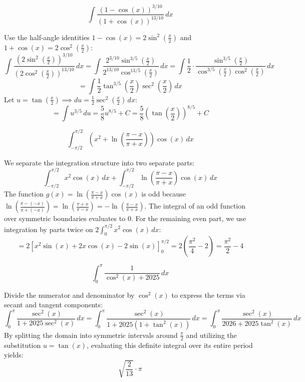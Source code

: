 \begin{questions}
    \question 
    \[ \int \frac{(1-\cos(x))^{3/10}}{(1+\cos(x))^{13/10}} \, dx \]
    \begin{solution}
        Use the half-angle identities $1-\cos(x) = 2\sin^2(\frac{x}{2})$ and $1+\cos(x) = 2\cos^2(\frac{x}{2})$:
        \[ \int \frac{\left(2\sin^2\left(\frac{x}{2}\right)\right)^{3/10}}{\left(2\cos^2\left(\frac{x}{2}\right)\right)^{13/10}} \, dx = \int \frac{2^{3/10}\sin^{3/5}\left(\frac{x}{2}\right)}{2^{13/10}\cos^{13/5}\left(\frac{x}{2}\right)} \, dx = \int \frac{1}{2} \cdot \frac{\sin^{3/5}\left(\frac{x}{2}\right)}{\cos^{3/5}\left(\frac{x}{2}\right)\cos^2\left(\frac{x}{2}\right)} \, dx \]
        \[ = \int \frac{1}{2}\tan^{3/5}\left(\frac{x}{2}\right)\sec^2\left(\frac{x}{2}\right) \, dx \]
        Let $u = \tan(\frac{x}{2}) \implies du = \frac{1}{2}\sec^2(\frac{x}{2}) \, dx$:
        \[ = \int u^{3/5} \, du = \frac{5}{8}u^{8/5} + C = \frac{5}{8}\left(\tan\left(\frac{x}{2}\right)\right)^{8/5} + C \]
    \end{solution}

    \question 
    \[ \int_{-\pi/2}^{\pi/2} \left(x^{2}+\ln\left(\frac{\pi-x}{\pi+x}\right)\right)\cos(x) \, dx \]
    \begin{solution}
        We separate the integration structure into two separate parts:
        \[ \int_{-\pi/2}^{\pi/2} x^2\cos(x) \, dx + \int_{-\pi/2}^{\pi/2} \ln\left(\frac{\pi-x}{\pi+x}\right)\cos(x) \, dx \]
        The function $g(x) = \ln(\frac{\pi-x}{\pi+x})\cos(x)$ is odd because $\ln(\frac{\pi-(-x)}{\pi+(-x)}) = \ln(\frac{\pi+x}{\pi-x}) = -\ln(\frac{\pi-x}{\pi+x})$. The integral of an odd function over symmetric boundaries evaluates to $0$.
        For the remaining even part, we use integration by parts twice on $2\int_{0}^{\pi/2} x^2\cos(x) \, dx$:
        \[ = 2\left[ x^2\sin(x) + 2x\cos(x) - 2\sin(x) \right]_{0}^{\pi/2} = 2\left(\frac{\pi^2}{4} - 2\right) = \frac{\pi^2}{2} - 4 \]
    \end{solution}

    \question 
    \[ \int_{0}^{\pi} \frac{1}{\cos^{2}(x)+2025} \, dx \]
    \begin{solution}
        Divide the numerator and denominator by $\cos^2(x)$ to express the terms via secant and tangent components:
        \[ \int_{0}^{\pi} \frac{\sec^2(x)}{1+2025\sec^2(x)} \, dx = \int_{0}^{\pi} \frac{\sec^2(x)}{1+2025(1+\tan^2(x))} \, dx = \int_{0}^{\pi} \frac{\sec^2(x)}{2026+2025\tan^2(x)} \, dx \]
        By splitting the domain into symmetric intervals around $\frac{\pi}{2}$ and utilizing the substitution $u = \tan(x)$, evaluating this definite integral over its entire period yields:
        \[ \sqrt{\frac{2}{13}}\cdot\pi \]
    \end{solution}


\end{questions}

